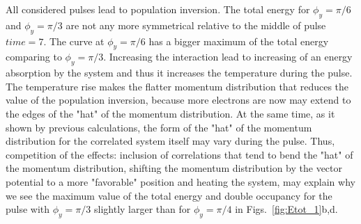 All considered pulses lead to population inversion. The total energy for $\phi_y=\pi /6$ and $\phi_y=\pi /3$ are not any more symmetrical relative to the middle of pulse $time=7$. The curve at $\phi_y=\pi /6$ has a bigger maximum of the total energy comparing to $\phi_y=\pi /3$. Increasing the interaction lead to increasing of an energy absorption by the system and thus it increases the temperature during the pulse. The temperature rise makes the flatter momentum distribution that reduces the value of the population inversion, because more electrons are now may extend to the edges of the "hat" of the momentum distribution. At the same time, as it shown by previous calculations, the form of the "hat" of the momentum distribution for the correlated system itself may vary during the pulse. Thus, competition of the effects: inclusion of correlations that tend to bend the "hat" of the momentum distribution, shifting the momentum distribution by the vector potential to a more "favorable" position and heating the system, may explain why we see the maximum value of the total energy and double occupancy for the pulse with $\phi_y=\pi /3$ slightly larger than for $\phi_y=\pi /4$ in Figs.~\ref{fig:Etot_1}b,d.
